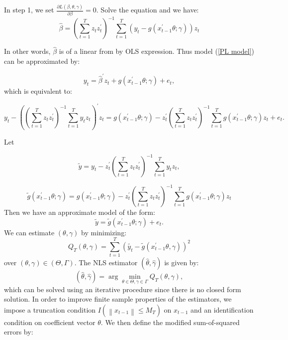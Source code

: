 \documentclass[a4paper,12pt,times,numbered,print,index]{report}
\numberwithin{equation}{section}
\begin{document}
	In step 1, we set $\frac{\partial L(\beta, \theta, \gamma)}{\partial \beta} = 0$. Solve the equation and we have:
	\begin{equation}
		\hat{\beta} = \left( \sum_{t=1}^{T}z_t z_t^{\prime}\right)^{-1}\sum_{t=1}^{T}\left( y_t - g\left( x_{t-1}^{\prime }\theta; \gamma\right)\right) z_t
		\label{beta}
	\end{equation}
	
	In other words, $\hat{\beta}$ is of a linear from by OLS expression. Thus model (\ref{PL model}) can be approximated by:
	
	$$
	y_t = \hat{\beta}^{\prime} z_t + g\left( x_{t-1}^{\prime }\theta; \gamma\right) +e_{t},
	$$
	which is equivalent to:
	
	$$
	y_t - \left( \left( \sum_{t=1}^{T}z_t z_t^{\prime}\right)^{-1} \sum_{t=1}^{T}y_t z_t \right) ^{\prime} z_t = g\left( x_{t-1}^{\prime }\theta; \gamma\right) - z_t^{\prime} \left( \sum_{t=1}^{T}z_t z_t^{\prime}\right)^{-1} \sum_{t=1}^{T} g\left( x_{t-1}^{\prime }\theta; \gamma\right) z_t + e_t.
	$$
	
	Let  
	
	$$\tilde{y} = y_t -  z_t^{\prime}  \left( \sum_{t=1}^{T}z_t z_t^{\prime}\right)^{-1} \sum_{t=1}^{T}y_t z_t, $$ 
	
	$$\tilde{g} ( x_{t-1}^{\prime }\theta; \gamma) = g\left( x_{t-1}^{\prime }\theta; \gamma\right) - z_t^{\prime} \left( \sum_{t=1}^{T}z_t z_t^{\prime}\right)^{-1} \sum_{t=1}^{T} g\left( x_{t-1}^{\prime }\theta; \gamma\right) z_t$$ 
	Then we have an approximate model of the form:
	\begin{equation}
		\tilde{y} = \tilde{g}\left( x_{t-1}^{\prime }\theta; \gamma\right) + e_t.
		\label{trans_model}
	\end{equation}
	We can estimate $(\theta, \gamma)$ by minimizing:
	$$
	Q_{T}(\theta, \gamma)=\sum_{t=1}^{T}\left(\tilde{y_{t}}-\tilde{g}\left(x_{t-1}^{\prime} \theta, \gamma\right)\right)^{2}
	$$
	over $(\theta, \gamma) \in (\Theta, \Gamma)$.
	The NLS estimator $(\hat{\theta}, \hat{\gamma})$ is given by:
	\begin{equation*}
		\left( \widehat{\theta},\widehat{\gamma}\right) =\arg \min_{\theta \in \Theta
			,\gamma \in \Gamma }Q_{T}\left( \theta ,\gamma \right),  \label{nls_c3}
	\end{equation*}%
	which can be solved using an iterative procedure since there is no closed form solution. In order to improve finite sample properties of the estimators, we impose a truncation condition $I\left(\left\|x_{t-1}\right\| \leq M_T\right)$ on $x_{t-1}$ and an identification condition on coefficient vector $\theta$. We then define the modified sum-of-squared errors by:
	
\end{document}
